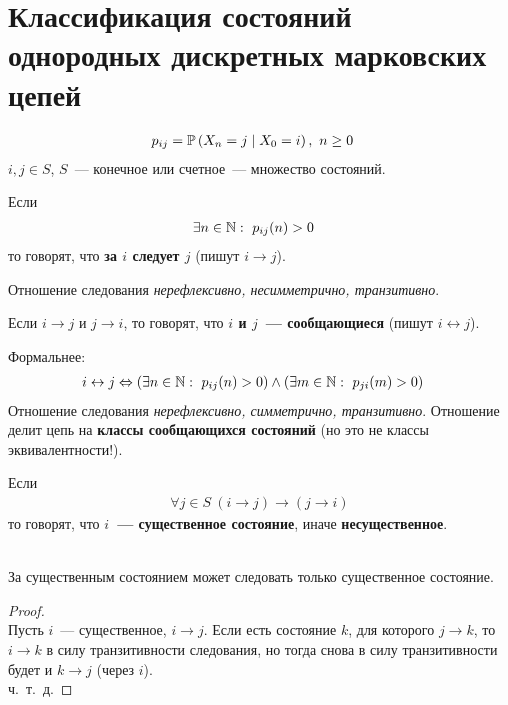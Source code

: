 \newpage
{}
\section{Классификация состояний однородных дискретных марковских цепей}
\begin{Des}
    \begin{align*}
      & p_{ij} = \mathbb{P} \left( X_n = j \mid X_0 = i \right), \ n \geq 0
    \end{align*}
    $i, j \in S$, $S$~--- конечное или счетное~--- множество состояний.
\end{Des}
\begin{Def}
    Если
    \begin{align*}
      & \exists n \in \mathbb{N}: \ p_{ij}(n) > 0
    \end{align*}
    то говорят, что \textbf{за $i$ следует $j$} (пишут $i \rightarrow j$).
\end{Def}
Отношение следования \textit{нерефлексивно, несимметрично, транзитивно}.
\begin{Def}
    Если $i \rightarrow j$ и $j \rightarrow i$, то говорят, что \textbf{$i$ и
      $j$~--- сообщающиеся} (пишут $i \leftrightarrow j$).
\end{Def}
Формальнее:
\begin{align*}
  & i \leftrightarrow j \Leftrightarrow \left( \exists n \in \NN: \ p_{ij}(n) > 0\right) \wedge \left( \exists m \in \NN: \ p_{ji}(m) > 0\right)
\end{align*}
Отношение следования \textit{нерефлексивно, симметрично, транзитивно}. Отношение
делит цепь на \textbf{классы сообщающихся состояний} (но это не классы
эквивалентности!).
\begin{Def}
    Если
    \begin{align*}
      \forall j \in S \ (i \rightarrow j) \rightarrow (j \rightarrow i)
    \end{align*}
    то говорят, что \textbf{$i$~--- существенное состояние}, иначе
    \textbf{несущественное}.
\end{Def}
\begin{theorem}
    ~
    \\
    За существенным состоянием может следовать только существенное состояние.
\end{theorem}
\begin{proof}
    ~
    \\
    Пусть $i$~--- существенное, $i \rightarrow j$. Если есть состояние $k$, для
    которого $j \rightarrow k$, то $i \rightarrow k$ в силу транзитивности
    следования, но тогда снова в силу транзитивности будет и $k \rightarrow j$
    (через $i$).
    \\
    ч.~т.~д.
\end{proof}

